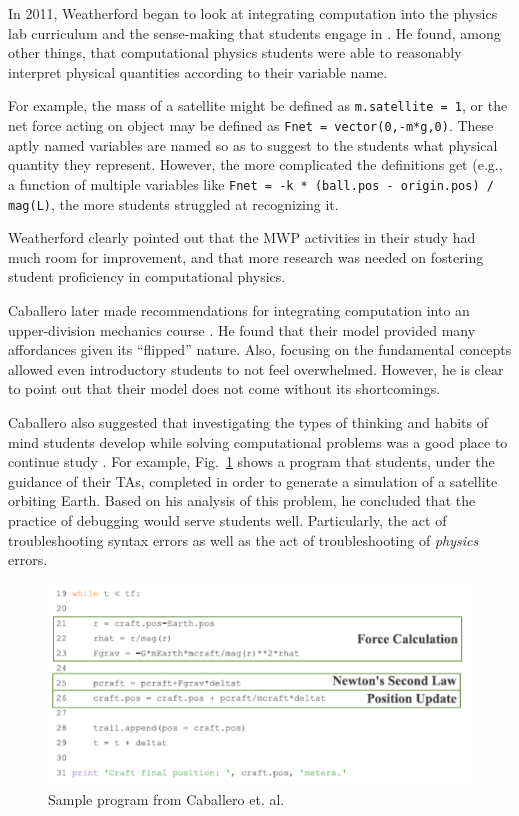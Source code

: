 \documentclass{msuphddissertation}
\begin{document}
\begin{doublespace}
In 2011, Weatherford began to look at integrating computation into the physics lab curriculum and the sense-making that students engage in \cite{Weatherford2011}.  He found, among other things, that computational physics students were able to reasonably interpret physical quantities according to their variable name.

For example, the mass of a satellite might be defined as \texttt{m.satellite = 1}, or the net force acting on object may be defined as \texttt{Fnet = vector(0,-m*g,0)}.  These aptly named variables are named so as to suggest to the students what physical quantity they represent.  However, the more complicated the definitions get (e.g., a function of multiple variables like \texttt{Fnet = -k * (ball.pos - origin.pos) / mag(L)}, the more students struggled at recognizing it.

Weatherford clearly pointed out that the MWP activities in their study had much room for improvement, and that more research was needed on fostering student proficiency in computational physics.

Caballero later made recommendations for integrating computation into an upper-division mechanics course \cite{Caballero2014}.  He found that their model provided many affordances given its ``flipped'' nature.  Also, focusing on the fundamental concepts allowed even introductory students to not feel overwhelmed.  However, he is clear to point out that their model does not come without its shortcomings.

Caballero also suggested that investigating the types of thinking and habits of mind students develop while solving computational problems was a good place to continue study \cite{Caballero2011}.  For example, Fig.~\ref{CH2:Caballero} shows a program that students, under the guidance of their TAs, completed in order to generate a simulation of a satellite orbiting Earth.  Based on his analysis of this problem, he concluded that the practice of debugging would serve students well.  Particularly, the act of troubleshooting syntax errors as well as the act of troubleshooting of \textit{physics} errors.

\begin{figure}\center
\includegraphics[scale=0.8]{images/CH2Caballero.pdf}
\caption{Sample program from Caballero et. al.}\label{CH2:Caballero}
\end{figure}


\end{doublespace}
\end{document}

